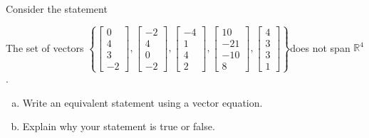 
\begin{exerciseStatement}


Consider the statement 
\begin{center}\begin{minipage}{0.8\textwidth}
 The set of vectors \( \left\{ \left[\begin{array}{c}
0 \\
4 \\
3 \\
-2
\end{array}\right] , \left[\begin{array}{c}
-2 \\
4 \\
0 \\
-2
\end{array}\right] , \left[\begin{array}{c}
-4 \\
1 \\
4 \\
2
\end{array}\right] , \left[\begin{array}{c}
10 \\
-21 \\
-10 \\
8
\end{array}\right] , \left[\begin{array}{c}
4 \\
3 \\
3 \\
1
\end{array}\right] \right\} \)does not span \(\mathbb{R}^4\). 
\end{minipage}\end{center}
    


\begin{enumerate}[(a)]
\item  Write an equivalent statement using a vector equation.
\item  Explain why your statement is true or false.
\end{enumerate}
    
\end{exerciseStatement}
    
